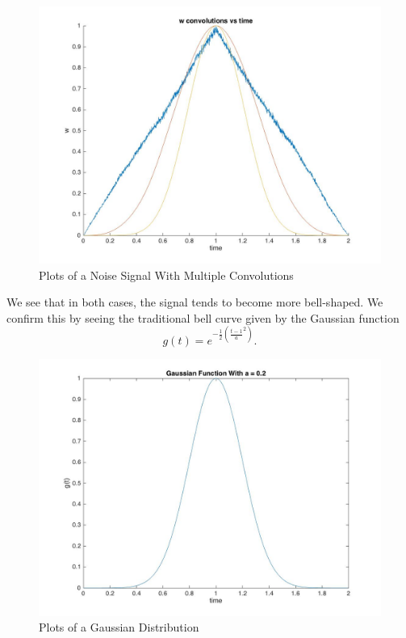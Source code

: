 \documentclass{article}
\begin{document}
\begin{figure}[!htb]
    \centering
        \includegraphics[scale = 0.32]{part3wplot.jpg}
        \caption{Plots of a Noise Signal With Multiple Convolutions}
\end{figure}

\FloatBarrier

We see that in both cases, the signal tends to become more bell-shaped. We confirm this by seeing the traditional bell curve given by the Gaussian function $$ g(t) = e^{-\frac{1}{2}(\frac{t-1}{a} ^2)}.$$ 

\begin{figure}[!htb]
    \centering
        \includegraphics[scale = 0.25]{Gaussian.jpg}
        \caption{Plots of a Gaussian Distribution}
\end{figure}
\end{document}

